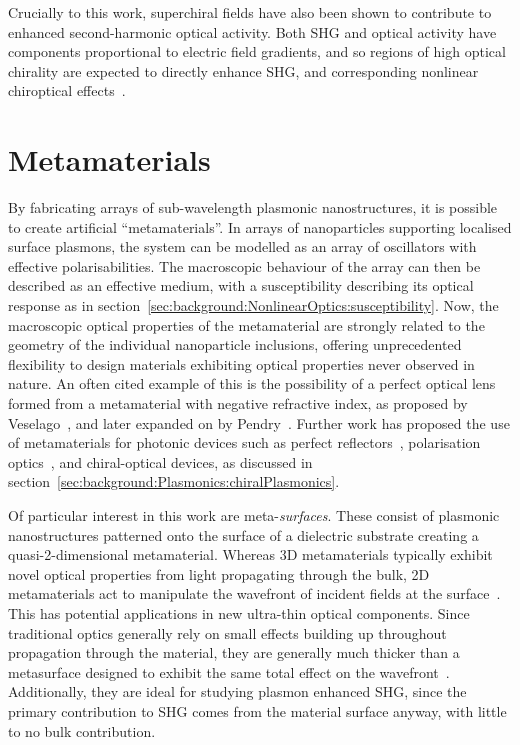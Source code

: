 Crucially to this work, superchiral fields have also been shown to contribute to enhanced second-harmonic optical activity. Both SHG and optical activity have components proportional to electric field gradients, and so regions of high optical chirality are expected to directly enhance SHG, and corresponding nonlinear chiroptical effects~\cite{Valev2014}.

\section{Metamaterials}
By fabricating arrays of sub-wavelength plasmonic nanostructures, it is possible to create artificial ``metamaterials''. In arrays of nanoparticles supporting localised surface plasmons, the system can be modelled as an array of oscillators with effective polarisabilities. The macroscopic behaviour of the array can then be described as an effective medium, with a susceptibility describing its optical response as in section~\ref{sec:background:NonlinearOptics:susceptibility}. Now, the macroscopic optical properties of the metamaterial are strongly related to the geometry of the individual nanoparticle inclusions, offering unprecedented flexibility to design materials exhibiting optical properties never observed in nature. An often cited example of this is the possibility of a perfect optical lens formed from a metamaterial with negative refractive index, as proposed by Veselago~\cite{Veselago1968}, and later expanded on by Pendry~\cite{Pendry2000}. Further work has proposed the use of metamaterials for photonic devices such as perfect reflectors~\cite{Moitra2015}, polarisation optics~\cite{Cong2015}, and chiral-optical devices, as discussed in section~\ref{sec:background:Plasmonics:chiralPlasmonics}.

Of particular interest in this work are meta-\textit{surfaces}. These consist of plasmonic nanostructures patterned onto the surface of a dielectric substrate creating a quasi-2-dimensional metamaterial. Whereas 3D metamaterials typically exhibit novel optical properties from light propagating through the bulk, 2D metamaterials act to manipulate the wavefront of incident fields at the surface~\cite{Meinzer2014}. This has potential applications in new ultra-thin optical components. Since traditional optics generally rely on small effects building up throughout propagation through the material, they are generally much thicker than a metasurface designed to exhibit the same total effect on the wavefront~\cite[\S 3]{Yao2014}. Additionally, they are ideal for studying plasmon enhanced SHG, since the primary contribution to SHG comes from the material surface anyway, with little to no bulk contribution. 

